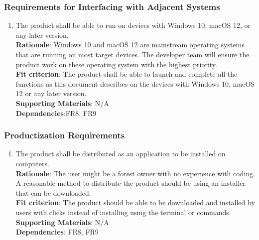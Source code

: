 \documentclass{article}
\begin{document}
\subsubsection{Requirements for Interfacing with Adjacent Systems}
\begin{enumerate}[OE2.1]
    \item The product shall be able to run on devices with Windows 10, macOS 12, or any later version.\\
    \textbf{Rationale}: Windows 10 and macOS 12 are mainstream operating systems that are running on most target devices. The developer team will ensure the product work on these operating system with the highest priority.\\
    \textbf{Fit criterion}: The product shall be able to launch and complete all the functions as this document describes on the devices with Windows 10, macOS 12 or any later version.\\
\textbf{Supporting Materials}: N/A\\
\textbf{Dependencies}:FR8, FR9\\

\end{enumerate}
\subsubsection{Productization Requirements}
\begin{enumerate}[OE3.1]
    \item The product shall be distributed as an application to be installed on computers.\\
    \textbf{Rationale}: The user might be a forest owner with no experience with coding. A reasonable method to distribute the product should be using an installer that can be downloaded. \\
    \textbf{Fit criterion}: The product should be able to be downloaded and installed by users with clicks instead of installing using the terminal or commands.\\
\textbf{Supporting Materials}: N/A\\
\textbf{Dependencies}: FR8, FR9\\

\end{enumerate}
\end{document}

